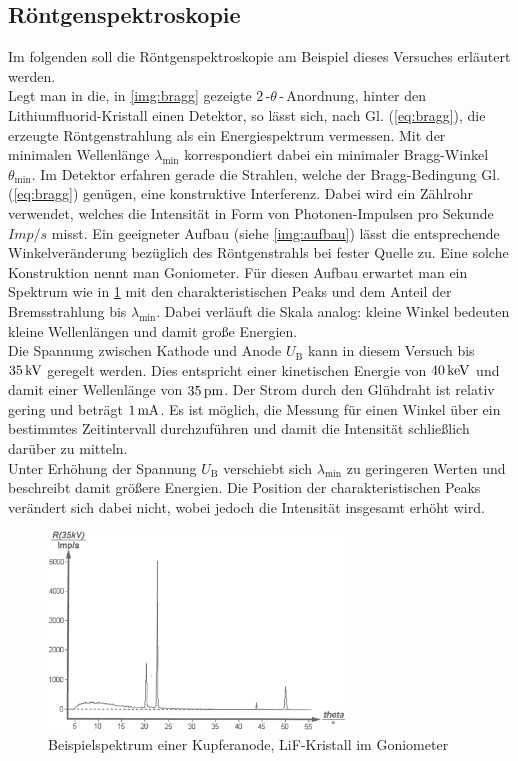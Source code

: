 \documentclass[numbers=noenddot,12pt,a4paper]{scrartcl}
\newcommand{\ix}[1]{_\text{#1}}
\begin{document}
\subsection{Röntgenspektroskopie}
Im folgenden soll die Röntgenspektroskopie am Beispiel dieses Versuches erläutert werden.\\
Legt man in die, in \ref{img:bragg} gezeigte $2$\,-$\theta$\,-\,Anordnung, hinter den Lithiumfluorid-Kristall einen Detektor, so lässt sich, nach Gl. (\ref{eq:bragg}), die erzeugte Röntgenstrahlung als ein Energiespektrum vermessen. Mit der minimalen Wellenlänge $\lambda\ix{min}$ korrespondiert dabei ein minimaler Bragg-Winkel $\theta\ix{min}$. Im Detektor erfahren gerade die Strahlen, welche der Bragg-Bedingung Gl. (\ref{eq:bragg}) genügen, eine konstruktive Interferenz. Dabei wird ein Zählrohr verwendet, welches die Intensität in Form von Photonen-Impulsen pro Sekunde $\unit{Imp/s}$ misst. Ein geeigneter Aufbau (siehe \ref{img:aufbau}) lässt die entsprechende Winkelveränderung bezüglich des Röntgenstrahls bei fester Quelle zu. Eine solche Konstruktion nennt man Goniometer. Für diesen Aufbau erwartet man ein Spektrum wie in \ref{img:spektr} mit den charakteristischen Peaks und dem Anteil der Bremsstrahlung bis $\lambda\ix{min}$. Dabei verläuft die Skala analog: kleine Winkel bedeuten kleine Wellenlängen und damit große Energien.\\
Die Spannung zwischen Kathode und Anode $U\ix{B}$ kann  in diesem Versuch bis $\unit[35]{kV}$ geregelt werden. Dies entspricht einer kinetischen Energie von $\unit[40]{keV}$ und damit einer Wellenlänge von $\unit[35]{pm}$. Der Strom durch den Glühdraht ist relativ gering und beträgt $\unit[1]{mA}$. Es ist möglich, die Messung für einen Winkel über ein bestimmtes Zeitintervall durchzuführen und damit die Intensität schließlich darüber zu mitteln.\\
Unter Erhöhung der Spannung $U\ix{B}$ verschiebt sich $\lambda\ix{min}$ zu geringeren Werten und beschreibt damit größere Energien. Die Position der charakteristischen Peaks verändert sich dabei nicht, wobei jedoch die Intensität insgesamt erhöht wird.
\begin{figure}[H]
	\centering
	\includegraphics[width=0.7\textwidth]{spektrum.png}
	\caption{Beispielspektrum einer Kupferanode, LiF-Kristall im Goniometer}\label{img:spektr}
\end{figure}
\newpage
\end{document}
